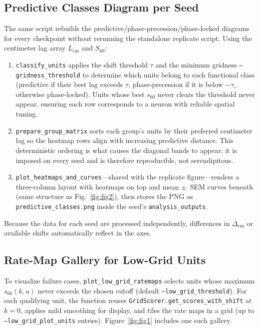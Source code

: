 \documentclass[11pt]{article}
\begin{document}
\subsection{Predictive Classes Diagram per Seed}
The same script rebuilds the predictive/phase-precession/phase-locked diagrams for every checkpoint without rerunning the standalone replicate script. Using the centimeter lag array $L_{\mathrm{cm}}$ and $S_{60}$:
\begin{enumerate}[label=\alph*., leftmargin=*]
    \item \texttt{classify\_units} applies the shift threshold $\tau$ and the minimum gridness \texttt{--gridness\_threshold} to determine which units belong to each functional class (predictive if their best lag exceeds $\tau$, phase-precession if it is below $-\tau$, otherwise phase-locked). Units whose best $s_{60}$ never clears the threshold never appear, ensuring each row corresponds to a neuron with reliable spatial tuning.
    \item \texttt{prepare\_group\_matrix} sorts each group's units by their preferred centimeter lag so the heatmap rows align with increasing predictive distance. This deterministic ordering is what causes the diagonal bands to appear; it is imposed on every seed and is therefore reproducible, not serendipitous.
    \item \texttt{plot\_heatmaps\_and\_curves}—shared with the replicate figure—renders a three-column layout with heatmaps on top and mean $\pm$~SEM curves beneath (same structure as Fig.~\ref{fig:fig2}), then stores the PNG as \texttt{predictive\_classes.png} inside the seed's \texttt{analysis\_outputs}.
\end{enumerate}
Because the data for each seed are processed independently, differences in $\Delta_{\mathrm{cm}}$ or available shifts automatically reflect in the axes.

\subsection{Rate-Map Gallery for Low-Grid Units}
To visualize failure cases, \texttt{plot\_low\_grid\_ratemaps} selects units whose maximum $s_{60}(k,u)$ never exceeds the chosen cutoff (default \texttt{--low\_grid\_threshold}). For each qualifying unit, the function reuses \texttt{GridScorer.get\_scores\_with\_shift} at $k=0$, applies mild smoothing for display, and tiles the rate maps in a grid (up to \texttt{--low\_grid\_plot\_units} entries). Figure~\ref{fig:fig1} includes one such gallery.
\end{document}
